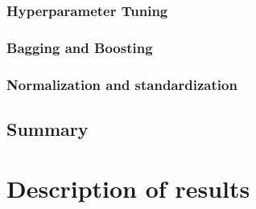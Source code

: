 \documentclass[12pt,a4paper]{report}
\begin{document}
\subsection*{Hyperparameter Tuning} 

\subsection*{Bagging and Boosting} 


\subsection*{Normalization and standardization} 


\section{Summary}


\chapter{Description of results}
\newpage


\newpage	
	
	
	
	
	
	
	
\end{document}
